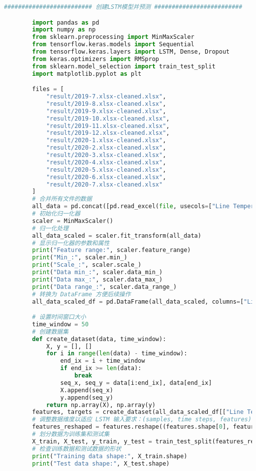 \documentclass[withoutpreface,bwprint]{cumcmthesis}  %
\begin{document}
\begin{appendices}
\begin{lstlisting}[language=python]
        ######################### 创建LSTM模型并预测 #########################

        import pandas as pd
        import numpy as np
        from sklearn.preprocessing import MinMaxScaler
        from tensorflow.keras.models import Sequential
        from tensorflow.keras.layers import LSTM, Dense, Dropout
        from keras.optimizers import RMSprop
        from sklearn.model_selection import train_test_split
        import matplotlib.pyplot as plt

        files = [
            "result/2019-7.xlsx-cleaned.xlsx",
            "result/2019-8.xlsx-cleaned.xlsx",
            "result/2019-9.xlsx-cleaned.xlsx",
            "result/2019-10.xlsx-cleaned.xlsx",
            "result/2019-11.xlsx-cleaned.xlsx",
            "result/2019-12.xlsx-cleaned.xlsx",
            "result/2020-1.xlsx-cleaned.xlsx",
            "result/2020-2.xlsx-cleaned.xlsx",
            "result/2020-3.xlsx-cleaned.xlsx",
            "result/2020-4.xlsx-cleaned.xlsx",
            "result/2020-5.xlsx-cleaned.xlsx",
            "result/2020-6.xlsx-cleaned.xlsx",
            "result/2020-7.xlsx-cleaned.xlsx"
        ]
        # 合并所有文件的数据
        all_data = pd.concat([pd.read_excel(file, usecols=["Line Temperature [掳C] DEV1", "Line Temperature [掳C] DEV2"]) for file in files], ignore_index=True)
        # 初始化归一化器
        scaler = MinMaxScaler()
        # 归一化处理
        all_data_scaled = scaler.fit_transform(all_data)
        # 显示归一化器的参数和属性
        print("Feature range:", scaler.feature_range)
        print("Min_:", scaler.min_)
        print("Scale_:", scaler.scale_)
        print("Data min_:", scaler.data_min_)
        print("Data max_:", scaler.data_max_)
        print("Data range_:", scaler.data_range_)
        # 转换为 DataFrame 方便后续操作
        all_data_scaled_df = pd.DataFrame(all_data_scaled, columns=["Line Temperature [掳C] DEV1", "Line Temperature [掳C] DEV2"])

        # 设置时间窗口大小
        time_window = 50
        # 创建数据集
        def create_dataset(data, time_window):
            X, y = [], []
            for i in range(len(data) - time_window):
                end_ix = i + time_window
                if end_ix >= len(data):
                    break
                seq_x, seq_y = data[i:end_ix], data[end_ix]
                X.append(seq_x)
                y.append(seq_y)
            return np.array(X), np.array(y)
        features, targets = create_dataset(all_data_scaled_df[["Line Temperature [掳C] DEV1", "Line Temperature [掳C] DEV2"]].values, time_window)
        # 调整数据维度以适应 LSTM 输入要求：(samples, time steps, features)
        features_reshaped = features.reshape((features.shape[0], features.shape[1], 2))
        # 划分数据为训练集和测试集
        X_train, X_test, y_train, y_test = train_test_split(features_reshaped, targets, test_size=0.2, random_state=42)
        # 检查训练数据和测试数据的形状
        print("Training data shape:", X_train.shape)
        print("Test data shape:", X_test.shape)


\end{lstlisting}
\end{appendices}
\end{document}
